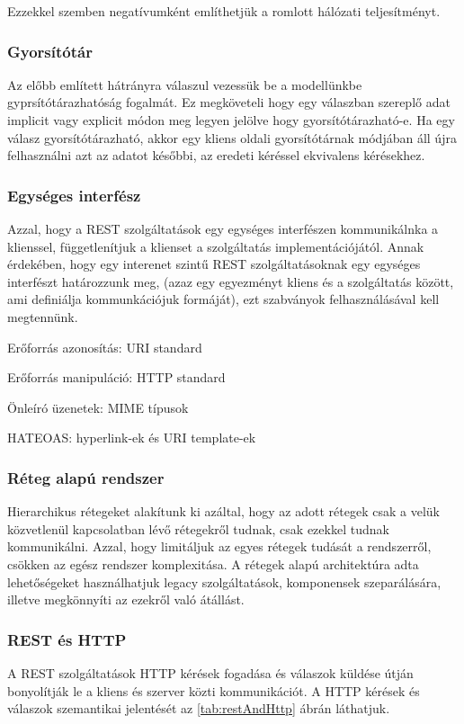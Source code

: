 Ezzekkel szemben negatívumként említhetjük a romlott hálózati teljesítményt.

\subsubsection{Gyorsítótár}

Az előbb említett hátrányra válaszul vezessük be a modellünkbe gyprsítótárazhatóság fogalmát. Ez megköveteli hogy egy válaszban szereplő adat implicit vagy explicit módon meg legyen jelölve hogy gyorsítótárazható-e. Ha egy válasz gyorsítótárazható, akkor egy kliens oldali gyorsítótárnak módjában áll újra felhasználni azt az adatot későbbi, az eredeti kéréssel ekvivalens kérésekhez.

\subsubsection{Egységes interfész}
Azzal, hogy a REST szolgáltatások egy egységes interfészen kommunikálnka a klienssel, függetlenítjuk a klienset a szolgáltatás implementációjától. Annak érdekében, hogy egy interenet szintű REST szolgáltatásoknak egy egységes interfészt határozzunk meg, (azaz egy egyezményt kliens és a szolgáltatás között, ami definiálja kommunkációjuk formáját), ezt szabványok felhasználásával kell megtennünk.

\begin{listing}
	\item Erőforrás azonosítás: URI standard
	\item Erőforrás manipuláció: HTTP standard
	\item Önleíró üzenetek: MIME típusok
	\item HATEOAS: hyperlink-ek és URI template-ek
\end{listing}

\subsubsection{Réteg alapú rendszer}

Hierarchikus rétegeket alakítunk ki azáltal, hogy az adott rétegek csak a velük közvetlenül kapcsolatban lévő rétegekről tudnak, csak ezekkel tudnak kommunikálni. Azzal, hogy limitáljuk az egyes rétegek tudását a rendszerről, csökken az egész rendszer komplexitása. A rétegek alapú architektúra adta lehetőségeket használhatjuk legacy szolgáltatások, komponensek szeparálására, illetve megkönnyíti az ezekről való átállást.

\subsubsection{REST és HTTP}

A REST szolgáltatások HTTP kérések fogadása és válaszok küldése útján bonyolítják le a kliens és szerver közti kommunikációt. A HTTP kérések és válaszok szemantikai jelentését az \ref{tab:restAndHttp} ábrán láthatjuk.